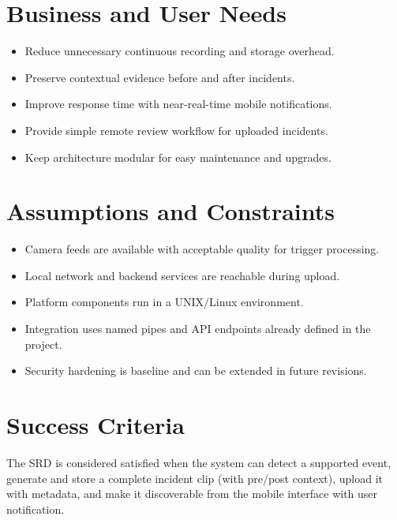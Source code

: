 \section{Business and User Needs}
\begin{itemize}
\item Reduce unnecessary continuous recording and storage overhead.
\item Preserve contextual evidence before and after incidents.
\item Improve response time with near-real-time mobile notifications.
\item Provide simple remote review workflow for uploaded incidents.
\item Keep architecture modular for easy maintenance and upgrades.
\end{itemize}

\section{Assumptions and Constraints}
\begin{itemize}
\item Camera feeds are available with acceptable quality for trigger processing.
\item Local network and backend services are reachable during upload.
\item Platform components run in a UNIX/Linux environment.
\item Integration uses named pipes and API endpoints already defined in the project.
\item Security hardening is baseline and can be extended in future revisions.
\end{itemize}

\section{Success Criteria}
The SRD is considered satisfied when the system can detect a supported event, generate and store a complete incident clip (with pre/post context), upload it with metadata, and make it discoverable from the mobile interface with user notification.